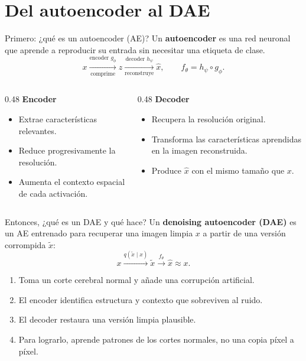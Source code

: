 \documentclass[10pt,aspectratio=169]{beamer}
\begin{document}
\section{Del autoencoder al DAE}

\begin{frame}{Primero: ¿qué es un autoencoder (AE)?}
  Un \textbf{autoencoder} es una red neuronal que aprende a reproducir su entrada
  sin necesitar una etiqueta de clase.
  \[
    x\xrightarrow[\text{comprime}]{\text{encoder }g_\phi}
    z\xrightarrow[\text{reconstruye}]{\text{decoder }h_\psi}
    \hat{x},\qquad f_\theta=h_\psi\circ g_\phi.
  \]

  \begin{columns}[T]
    \begin{column}{0.48\textwidth}
      \textbf{Encoder}
      \begin{itemize}
        \item Extrae características relevantes.
        \item Reduce progresivamente la resolución.
        \item Aumenta el contexto espacial de cada activación.
      \end{itemize}
    \end{column}
    \begin{column}{0.48\textwidth}
      \textbf{Decoder}
      \begin{itemize}
        \item Recupera la resolución original.
        \item Transforma las características aprendidas en la imagen reconstruida.
        \item Produce $\hat{x}$ con el mismo tamaño que $x$.
      \end{itemize}
    \end{column}
  \end{columns}
\end{frame}

\begin{frame}{Entonces, ¿qué es un DAE y qué hace?}
  Un \textbf{denoising autoencoder (DAE)} es un AE entrenado para recuperar una
  imagen limpia $x$ a partir de una versión corrompida $\widetilde{x}$:
  \[
    x\xrightarrow{q(\widetilde{x}\mid x)}\widetilde{x}
    \xrightarrow{f_\theta}\hat{x}\approx x.
  \]

  \begin{enumerate}
    \item Toma un corte cerebral normal y añade una corrupción artificial.
    \item El encoder identifica estructura y contexto que sobreviven al ruido.
    \item El decoder restaura una versión limpia plausible.
    \item Para lograrlo, aprende patrones de los cortes normales, no una copia píxel a píxel.
  \end{enumerate}

\end{frame}
\end{document}
